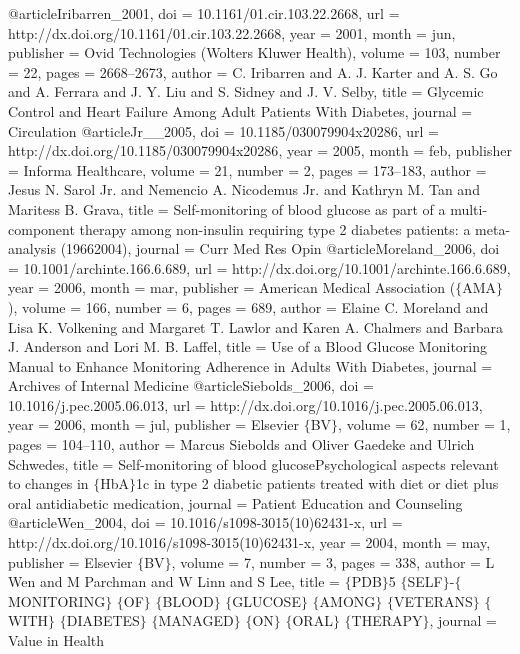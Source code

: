 @article{Iribarren_2001,
	doi = {10.1161/01.cir.103.22.2668},
	url = {http://dx.doi.org/10.1161/01.cir.103.22.2668},
	year = 2001,
	month = {jun},
	publisher = {Ovid Technologies (Wolters Kluwer Health)},
	volume = {103},
	number = {22},
	pages = {2668--2673},
	author = {C. Iribarren and A. J. Karter and A. S. Go and A. Ferrara and J. Y. Liu and S. Sidney and J. V. Selby},
	title = {Glycemic Control and Heart Failure Among Adult Patients With Diabetes},
	journal = {Circulation}
}
@article{Jr__2005,
	doi = {10.1185/030079904x20286},
	url = {http://dx.doi.org/10.1185/030079904x20286},
	year = 2005,
	month = {feb},
	publisher = {Informa Healthcare},
	volume = {21},
	number = {2},
	pages = {173--183},
	author = {Jesus N. Sarol Jr. and Nemencio A. Nicodemus Jr. and Kathryn M. Tan and Maritess B. Grava},
	title = {Self-monitoring of blood glucose as part of a multi-component therapy among non-insulin requiring type 2 diabetes patients: a meta-analysis (1966{\textendash}2004){\ast}},
	journal = {Curr Med Res Opin}
}
@article{Moreland_2006,
	doi = {10.1001/archinte.166.6.689},
	url = {http://dx.doi.org/10.1001/archinte.166.6.689},
	year = 2006,
	month = {mar},
	publisher = {American Medical Association ($\lbrace$AMA$\rbrace$)},
	volume = {166},
	number = {6},
	pages = {689},
	author = {Elaine C. Moreland and Lisa K. Volkening and Margaret T. Lawlor and Karen A. Chalmers and Barbara J. Anderson and Lori M. B. Laffel},
	title = {Use of a Blood Glucose Monitoring Manual to Enhance Monitoring Adherence in Adults With Diabetes},
	journal = {Archives of Internal Medicine}
}
@article{Siebolds_2006,
	doi = {10.1016/j.pec.2005.06.013},
	url = {http://dx.doi.org/10.1016/j.pec.2005.06.013},
	year = 2006,
	month = {jul},
	publisher = {Elsevier $\lbrace$BV$\rbrace$},
	volume = {62},
	number = {1},
	pages = {104--110},
	author = {Marcus Siebolds and Oliver Gaedeke and Ulrich Schwedes},
	title = {Self-monitoring of blood glucose{\textemdash}Psychological aspects relevant to changes in $\lbrace$HbA$\rbrace$1c in type 2 diabetic patients treated with diet or diet plus oral antidiabetic medication},
	journal = {Patient Education and Counseling}
}
@article{Wen_2004,
	doi = {10.1016/s1098-3015(10)62431-x},
	url = {http://dx.doi.org/10.1016/s1098-3015(10)62431-x},
	year = 2004,
	month = {may},
	publisher = {Elsevier $\lbrace$BV$\rbrace$},
	volume = {7},
	number = {3},
	pages = {338},
	author = {L Wen and M Parchman and W Linn and S Lee},
	title = {$\lbrace$PDB$\rbrace$5 $\lbrace$SELF$\rbrace$-$\lbrace$MONITORING$\rbrace$ $\lbrace$OF$\rbrace$ $\lbrace$BLOOD$\rbrace$ $\lbrace$GLUCOSE$\rbrace$ $\lbrace$AMONG$\rbrace$ $\lbrace$VETERANS$\rbrace$ $\lbrace$WITH$\rbrace$ $\lbrace$DIABETES$\rbrace$ $\lbrace$MANAGED$\rbrace$ $\lbrace$ON$\rbrace$ $\lbrace$ORAL$\rbrace$ $\lbrace$THERAPY$\rbrace$},
	journal = {Value in Health}
}
